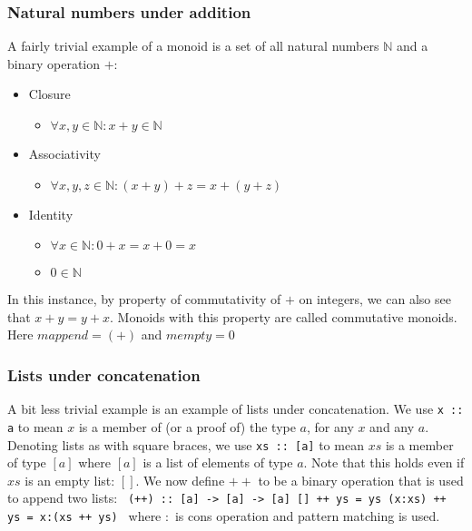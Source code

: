 \documentclass{acm_proc_article-sp}
\begin{document}
\subsubsection{Natural numbers under addition}
A fairly trivial example of a monoid is a set of all natural numbers
$\mathbb{N}$ and a binary operation $+$:
\begin{itemize}
\item Closure
  \begin{itemize}
  \item $\forall x,y \in \mathbb{N} : x + y \in \mathbb{N}$
  \end{itemize}
\item Associativity
  \begin{itemize}
  \item $\forall x,y,z \in \mathbb{N} : (x + y) + z = x + (y + z)$
  \end{itemize}
\item Identity
  \begin{itemize}
  \item $\forall x \in \mathbb{N} : 0 + x = x + 0 = x$
  \item $0 \in \mathbb{N}$
  \end{itemize}
\end{itemize}
In this instance, by property of commutativity of $+$ on integers, we
can also see that $x + y = y + x$. Monoids with this property are
called commutative monoids. Here $mappend = (+)$ and $mempty = 0$

\subsubsection{Lists under concatenation}
A bit less trivial example is an example of lists under concatenation.
We use \texttt{x :: a} to mean $x$ is a member of (or a proof of) the
type $a$, for any $x$ and any $a$. Denoting lists as with square
braces, we use \texttt{xs :: [a]} to mean $xs$ is a member of type
$[a]$ where $[a]$ is a list of elements of type $a$. Note that this
holds even if $xs$ is an empty list: $[]$. We now define $++$ to be a
binary operation that is used to append two lists:
\texttt{
(++) :: [a] -> [a] -> [a]
[] ++ ys = ys
(x:xs) ++ ys = x:(xs ++ ys)
} where $:$ is cons operation and pattern matching is used.
\end{document}
